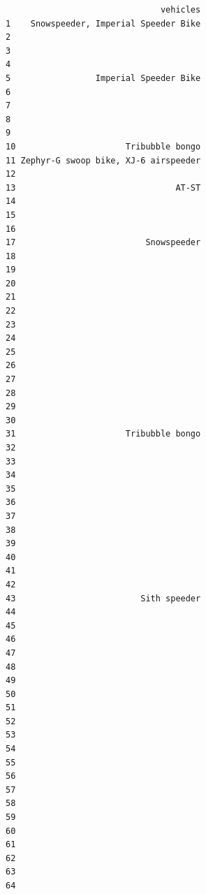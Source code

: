 \documentclass[
]{article}
\begin{document}
\begin{verbatim}
                               vehicles
1    Snowspeeder, Imperial Speeder Bike
2                                      
3                                      
4                                      
5                 Imperial Speeder Bike
6                                      
7                                      
8                                      
9                                      
10                      Tribubble bongo
11 Zephyr-G swoop bike, XJ-6 airspeeder
12                                     
13                                AT-ST
14                                     
15                                     
16                                     
17                          Snowspeeder
18                                     
19                                     
20                                     
21                                     
22                                     
23                                     
24                                     
25                                     
26                                     
27                                     
28                                     
29                                     
30                                     
31                      Tribubble bongo
32                                     
33                                     
34                                     
35                                     
36                                     
37                                     
38                                     
39                                     
40                                     
41                                     
42                                     
43                         Sith speeder
44                                     
45                                     
46                                     
47                                     
48                                     
49                                     
50                                     
51                                     
52                                     
53                                     
54                                     
55                                     
56                                     
57                                     
58                                     
59                                     
60                                     
61                                     
62                                     
63                                     
64                                     

\end{verbatim}
\end{document}
